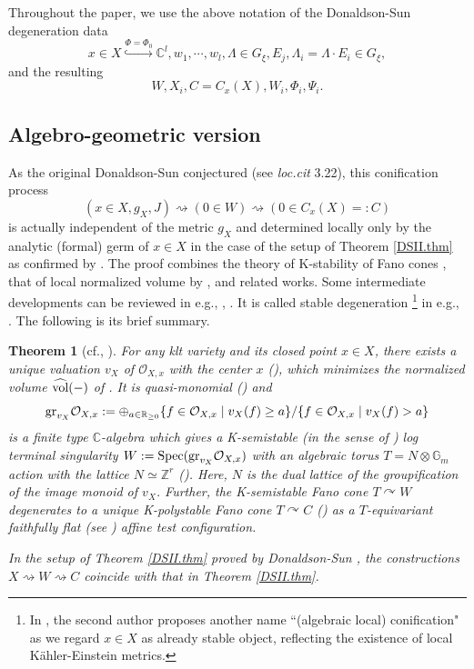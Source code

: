\documentclass[12pt,a4paper]{amsart}
\newtheorem{Thm}{Theorem}[section]
\theoremstyle{remark}
\theoremstyle{definition}
\def\R{\mathbb{R}}
\def\C{\mathbb{C}}
\def\G{\mathbb{G}}
\def\Z{\mathbb{Z}}
\begin{document}
Throughout the paper, 
we use the above notation of the Donaldson-Sun degeneration data 
$$x\in X\overset{\Phi=\Phi_0}{\hookrightarrow} \C^l, 
w_1,\cdots,w_l, \Lambda\in G_\xi, E_j, 
\Lambda_i=\Lambda\cdot E_i\in G_\xi,$$ 
and the resulting 
$$W,X_i, C=C_x(X),W_i,\Phi_i,\Psi_i.$$ 

\subsection{Algebro-geometric version}\label{subsec:AGlc}
As the original Donaldson-Sun \cite{DSII} conjectured (see {\it loc.cit} 3.22), this 
conification process 
$$(x\in X,g_X,J) \rightsquigarrow (0\in W)\rightsquigarrow (0\in 
C_x(X)=:C)$$ 
is actually independent of the metric $g_X$ and 
determined locally only by the analytic (formal) germ of $x\in X$ 
in the case of the setup of Theorem \ref{DSII.thm} 
as confirmed by \cite{LWX}. The proof combines the theory of 
K-stability of Fano cones \cite{CS}, that 
of local normalized volume by \cite{Li}, and related works. 
Some intermediate developments can be reviewed in e.g., \cite{LLX}, 
\cite[\S 2]{Od24a}. It is 
called stable degeneration
\footnote{In \cite{Od24a,Od24c}, 
the second author proposes another name ``(algebraic local) conification"   as we regard $x\in X$ as already stable object, reflecting the existence of local K\"ahler-Einstein metrics.} 
in e.g., \cite{LLX}. The following is its  brief summary. 

\begin{Thm}[cf., \cite{Li, Blum, CS, LX, LWX, Xu, XZ}]\label{AGlc}
For any klt variety and its closed point $x\in X$, 
there exists a unique valuation $v_X$ of $\mathcal{O}_{X,x}$ with the center $x$ 
(\cite{Blum}), which minimizes the 
normalized volume $\widehat{\rm vol}(-)$ of \cite{Li}. 
It 
is quasi-monomial (\cite{Xu}) 
and 
$${\rm gr}_{v_X} \mathcal{O}_{X,x}:=\oplus_{a\in \R_{\ge 0}}\{f\in \mathcal{O}_{X,x}\mid v_X(f)\ge a\}/\{f\in \mathcal{O}_{X,x}\mid v_X(f)> a\}$$ 
is a finite type $\C$-algebra which gives a 
K-semistable (in the sense of \cite{CS}) 
log terminal singularity $W:={\rm Spec}({\rm gr}_{v_X} \mathcal{O}_{X,x})$ with 
an algebraic torus $T=N\otimes \G_m$ action with the lattice $N\simeq \Z^r$ (\cite{LX, XZ}). 
Here, $N$ is the dual lattice of the groupification of the 
image monoid of $v_X$. Further, the 
K-semistable Fano cone $T\curvearrowright 
W$ degenerates to a unique K-polystable Fano cone 
$T\curvearrowright C$ (\cite{LWX}) as a $T$-equivariant faithfully flat 
(see \cite[\S 2]{Od24a}) affine test configuration. 

In the setup of Theorem \ref{DSII.thm} proved by Donaldson-Sun 
\cite{DSII}, the constructions $X\rightsquigarrow W\rightsquigarrow C$ 
coincide with that in 
Theorem \ref{DSII.thm}. 
\end{Thm}
\end{document}
